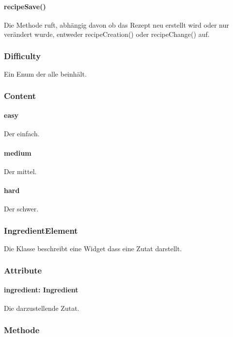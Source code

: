 \documentclass[parskip=full]{scrartcl}
\begin{document}
                \paragraph*{recipeSave()} Die Methode ruft, abhängig davon ob das Rezept neu erstellt wird oder nur verändert wurde, entweder recipeCreation() oder recipeChange() auf.
        
        \subsubsection{Difficulty}
            Ein Enum der alle  beinhält.
            \subsubsection*{Content}
                \paragraph*{easy} Der  einfach.
                \paragraph*{medium} Der  mittel.
                \paragraph*{hard} Der  schwer.

        \subsubsection*{IngredientElement}
            Die Klasse beschreibt eine Widget dass eine Zutat darstellt.
            \subsubsection*{Attribute}
                \paragraph*{ingredient: Ingredient} Die darzustellende Zutat.

            \subsubsection*{Methode}
\end{document}
